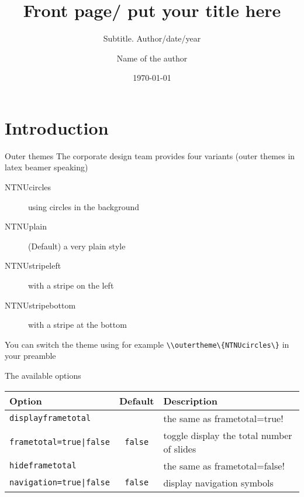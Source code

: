 \documentclass[aspectratio=169]{beamer}
\title[Your Short Title]{Front page/ put your title here}
\subtitle{Subtitle. Author/date/year}
\institute{\texttt{[image: ntnulogo\_eng\_neg.png]}}
\author{Name of the author}
\date{\today}
\begin{document}
	\maketitle
	\tableofcontents

	\section{Introduction}
	\begin{frame}{Outer themes}
		The corporate design team provides four variants (outer themes in latex beamer speaking)

		\begin{description}
			\item[NTNUcircles] using circles in the background
			\item[NTNUplain] (Default) a very plain style
			\item[NTNUstripeleft] with a stripe on the left
			\item[NTNUstripebottom] with a stripe at the bottom
		\end{description}

		You can switch the theme using for example
		\lstinline!\\outertheme\{NTNUcircles\}!
		in your preamble
	\end{frame}
	\begin{frame}[fragile]{The available options}
		\begin{tabular}{lcl}
			\toprule
			\textbf{Option} & \textbf{Default} &\textbf{Description} \\
			\midrule
			\lstinline!displayframetotal! && the same as \lstinline!!frametotal=true! \\
			\lstinline!frametotal=true|false! & \lstinline!false! & toggle display the total number of slides\\
			\lstinline!hideframetotal! && the same as \lstinline!!frametotal=false! \\
			\lstinline!navigation=true|false! & \lstinline!false! & display navigation symbols
			\\
			\bottomrule
		\end{tabular}
	\end{frame}
\end{document}
